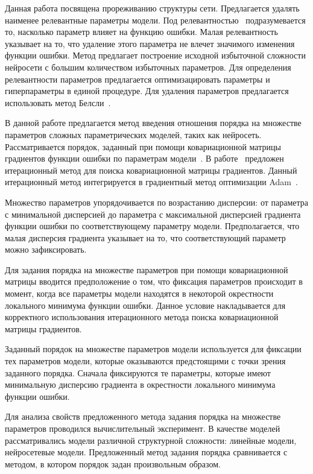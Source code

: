 Данная работа посвящена прореживанию структуры сети. Предлагается удалять наименее релевантные параметры модели. Под релевантностью~\cite{cun1990} подразумевается то, насколько параметр влияет на функцию ошибки. Малая релевантность указывает на то, что удаление этого параметра не влечет значимого изменения функции ошибки. Метод предлагает построение исходной избыточной сложности нейросети с большим количеством избыточных параметров. Для определения релевантности параметров предлагается оптимизацировать параметры и гиперпараметры в единой процедуре. Для удаления параметров предлагается использовать метод Белсли~\cite{neychev2016}.


В данной работе предлагается метод введения отношения порядка на множестве параметров сложных параметрических моделей, таких как нейросеть. Рассматривается порядок, заданный при помощи ковариационной матрицы градиентов функции ошибки по параметрам модели~\cite{Mandt2017}. В работе~\cite{Chunyan2016} предложен итерационный метод для поиска ковариационной матрицы градиентов. Данный итерационный метод интегрируется в градиентный метод оптимизации Adam~\cite{kingma2014}.

Множество параметров упорядочивается по возрастанию дисперсии: от параметра с минимальной дисперсией до параметра с максимальной дисперсией градиента функции ошибки по соответствующему параметру модели. Предполагается, что малая дисперсия градиента указывает на то, что соответствующий параметр можно зафиксировать.

Для задания порядка на множестве параметров при помощи ковариационной матрицы вводится предположение о том, что фиксация параметров происходит в момент, когда все параметры модели находятся в некоторой окрестности локального минимума функции ошибки. Данное условие накладывается для корректного использования итерационного метода поиска ковариационной матрицы градиентов.

Заданный порядок на множестве параметров модели используется для фиксации тех параметров модели, которые оказываются предстоящими с точки зрения заданного порядка. Сначала фиксируются те параметры, которые имеют минимальную дисперсию градиента в окрестности локального минимума функции ошибки.

Для анализа свойств предложенного метода задания порядка на множестве параметров проводился вычислительный эксперимент. В качестве моделей рассматривались модели различной структурной сложности: линейные модели, нейросетевые модели. Предложенный метод задания порядка сравнивается с методом, в котором порядок задан произвольным образом.

